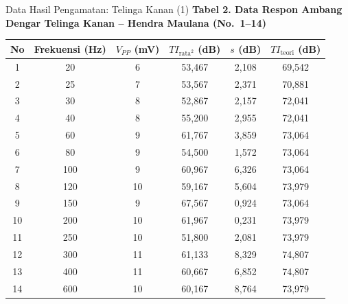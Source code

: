 \documentclass[aspectratio=169, 10pt]{beamer}
\begin{document}
	\begin{frame}{Data Hasil Pengamatan: Telinga Kanan (1)}
		\scriptsize
		\textbf{Tabel 2. Data Respon Ambang Dengar Telinga Kanan -- Hendra Maulana (No.\ 1--14)}
		\vspace{0.1cm}
		\begin{tabular}{cccccc}
			\toprule
			No & Frekuensi (Hz) & $V_{PP}$ (mV) & $TI_{\text{rata}^2}$ (dB) & $s$ (dB) & $TI_{\text{teori}}$ (dB) \\
			\midrule
			1  & 20     & 6  & 53{,}467 & 2{,}108  & 69{,}542 \\
			2  & 25     & 7  & 53{,}567 & 2{,}371  & 70{,}881 \\
			3  & 30     & 8  & 52{,}867 & 2{,}157  & 72{,}041 \\
			4  & 40     & 8  & 55{,}200 & 2{,}955  & 72{,}041 \\
			5  & 60     & 9  & 61{,}767 & 3{,}859  & 73{,}064 \\
			6  & 80     & 9  & 54{,}500 & 1{,}572  & 73{,}064 \\
			7  & 100    & 9  & 60{,}967 & 6{,}326  & 73{,}064 \\
			8  & 120    & 10 & 59{,}167 & 5{,}604  & 73{,}979 \\
			9  & 150    & 9  & 67{,}567 & 0{,}924  & 73{,}064 \\
			10 & 200    & 10 & 61{,}967 & 0{,}231  & 73{,}979 \\
			11 & 250    & 10 & 51{,}800 & 2{,}081  & 73{,}979 \\
			12 & 300    & 11 & 61{,}133 & 8{,}329  & 74{,}807 \\
			13 & 400    & 11 & 60{,}667 & 6{,}852  & 74{,}807 \\
			14 & 600    & 10 & 60{,}167 & 8{,}764  & 73{,}979 \\
			\bottomrule
		\end{tabular}
	\end{frame}
\end{document}
